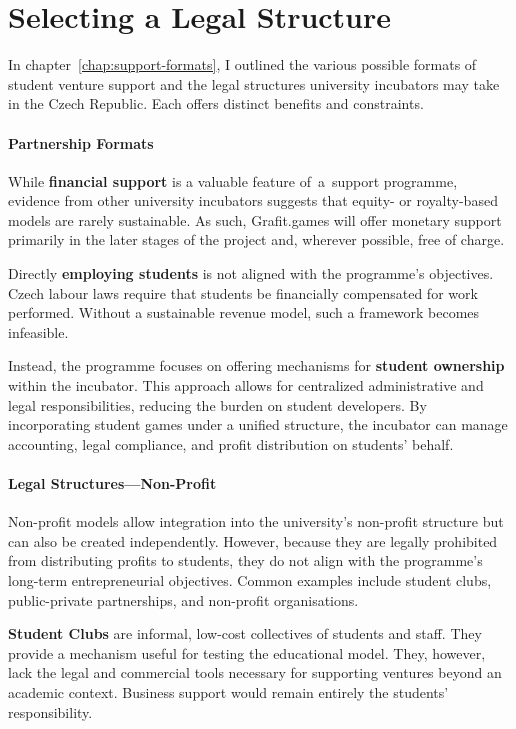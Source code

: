 \section{Selecting a Legal Structure}
In chapter~\ref{chap:support-formats}, I outlined the various possible formats of student venture support and the legal structures university incubators may take in the Czech Republic. Each offers distinct benefits and constraints.

\paragraph{Partnership Formats}
While \textbf{financial support} is a valuable feature of~a~support programme, evidence from other university incubators suggests that equity- or royalty-based models are rarely sustainable. As such, Grafit.games will offer monetary support primarily in the later stages of the project and, wherever possible, free of charge.

Directly \textbf{employing students} is not aligned with the programme’s objectives. Czech labour laws require that students be financially compensated for work performed. Without a sustainable revenue model, such a framework becomes infeasible.

Instead, the programme focuses on offering mechanisms for \textbf{student ownership} within the incubator. This approach allows for centralized administrative and legal responsibilities, reducing the burden on student developers. By incorporating student games under a unified structure, the incubator can manage accounting, legal compliance, and profit distribution on students’ behalf.

\paragraph{Legal Structures—Non-Profit}
Non-profit models allow integration into the university’s non-profit structure but can also be created independently. However, because they are legally prohibited from distributing profits to students, they do not align with the programme’s long-term entrepreneurial objectives. Common examples include student clubs, public-private partnerships, and non-profit organisations.

\textbf{Student Clubs} are informal, low-cost collectives of students and staff. They provide a mechanism useful for testing the educational model. They, however, lack the legal and commercial tools necessary for supporting ventures beyond an academic context. Business support would remain entirely the students’ responsibility.

